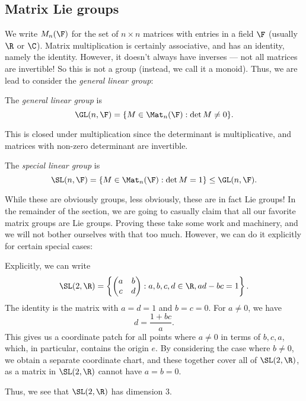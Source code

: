 \documentclass[a4paper]{article}
\begin{document}
\subsection{Matrix Lie groups}
We write $M_n(\F)$ for the set of $n\times n$ matrices with entries in a field $\F$ (usually $\R$ or $\C$). Matrix multiplication is certainly associative, and has an identity, namely the identity. However, it doesn't always have inverses --- not all matrices are invertible! So this is not a group (instead, we call it a monoid). Thus, we are lead to consider the \emph{general linear group}:

\begin{defi}
  The \emph{general linear group} is
  \[
    \GL(n, \F) = \{M \in \Mat_n(\F): \det M \not= 0\}.
  \]
\end{defi}
This is closed under multiplication since the determinant is multiplicative, and matrices with non-zero determinant are invertible.

\begin{defi}
  The \emph{special linear group} is
  \[
    \SL(n, \F) = \{M \in \Mat_n(\F): \det M =1\} \leq \GL(n, \F).
  \]
\end{defi}
While these are obviously groups, less obviously, these are in fact Lie groups! In the remainder of the section, we are going to casually claim that all our favorite matrix groups are Lie groups. Proving these take some work and machinery, and we will not bother ourselves with that too much. However, we can do it explicitly for certain special cases:

\begin{eg}
  Explicitly, we can write
  \[
    \SL(2, \R) = \left\{
      \begin{pmatrix}
        a & b\\
        c & d
      \end{pmatrix}:
    a, b, c, d \in \R, ad - bc = 1\right\}.
  \]
  The identity is the matrix with $a = d = 1$ and $b = c = 0$. For $a \not= 0$, we have
  \[
    d = \frac{1 + bc}{a}.
  \]
  This gives us a coordinate patch for all points where $a \not= 0$ in terms of $b, c, a$, which, in particular, contains the origin $e$. By considering the case where $b \not= 0$, we obtain a separate coordinate chart, and these together cover all of $\SL(2, \R)$, as a matrix in $\SL(2, \R)$ cannot have $a = b = 0$.

  Thus, we see that $\SL(2, \R)$ has dimension $3$.
\end{eg}
\end{document}
